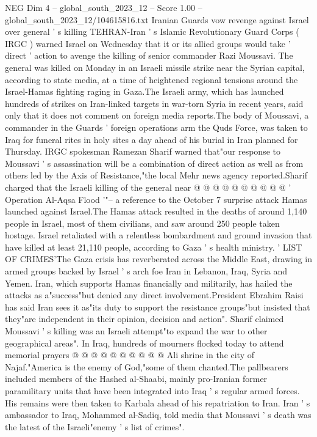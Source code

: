 \begin{textsample}{NEG Dim 4 – global\_south\_2023\_12 – Score 1.00 – global\_south\_2023\_12/104615816.txt}  \label{ex:f4_neg_327}
Iranian Guards vow revenge against Israel over general ' s killing TEHRAN-Iran ' s Islamic Revolutionary Guard Corps ( IRGC ) warned Israel on Wednesday that it or its allied groups would take ' direct ' action to avenge the killing of senior commander Razi Moussavi.
The general was killed on Monday in an Israeli missile strike near the Syrian capital, according to state media, at a time of heightened regional tensions around the Israel-Hamas fighting raging in Gaza.The Israeli army, which has launched hundreds of strikes on Iran-linked targets in war-torn Syria in recent years, said only that it does not comment on foreign media reports.The body of Moussavi, a commander in the Guards ' foreign operations arm the Quds Force, was taken to Iraq for funeral rites in holy sites a day ahead of his burial in Iran planned for Thursday.
IRGC spokesman Ramezan Sharif warned that"our response to Moussavi ' s assassination will be a combination of direct action as well as from others led by the Axis of Resistance,"the local Mehr news agency reported.Sharif charged that the Israeli killing of the general near @ @ @ @ @ @ @ @ @ @ ' Operation Al-Aqsa Flood '"-- a reference to the October 7 surprise attack Hamas launched against Israel.The Hamas attack resulted in the deaths of around 1,140 people in Israel, most of them civilians, and saw around 250 people taken hostage.
Israel retaliated with a relentless bombardment and ground invasion that have killed at least 21,110 people, according to Gaza ' s health ministry. ' LIST OF CRIMES'The Gaza crisis has reverberated across the Middle East, drawing in armed groups backed by Israel ' s arch foe Iran in Lebanon, Iraq, Syria and Yemen.
Iran, which supports Hamas financially and militarily, has hailed the attacks as a"success"but denied any direct involvement.President Ebrahim Raisi has said Iran sees it as"its duty to support the resistance groups"but insisted that they"are independent in their opinion, decision and action".
Sharif claimed Moussavi ' s killing was an Israeli attempt"to expand the war to other geographical areas".
In Iraq, hundreds of mourners flocked today to attend memorial prayers @ @ @ @ @ @ @ @ @ @ Ali shrine in the city of Najaf."America is the enemy of God,"some of them chanted.The pallbearers included members of the Hashed al-Shaabi, mainly pro-Iranian former paramilitary units that have been integrated into Iraq ' s regular armed forces.
His remains were then taken to Karbala ahead of his repatriation to Iran.
Iran ' s ambassador to Iraq, Mohammed al-Sadiq, told media that Moussavi ' s death was the latest of the Israeli"enemy ' s list of crimes".

\end{textsample}
